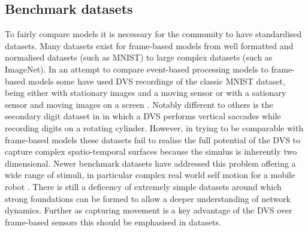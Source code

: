 \subsection{Benchmark datasets}
To fairly compare models it is necessary for the community to have standardised datasets\cite{barranco2016dataset, Gibson2014, tan2015benchmarking}.
Many datasets exist for frame-based models from well formatted and normalised datasets (such as MNIST\cite{lecun1998gradient}) to large complex datasets (such as ImageNet\cite{deng2009imagenet}).
In an attempt to compare event-based processing models to frame-based models some have used DVS recordings of the classic MNIST dataset, being either with stationary images and a moving sensor \cite{OConnor2013, orchard2015converting} or with a sationary sensor and moving images on a screen \cite{serrano2015poker, akolkar2015can}.
Notably different to others is the secondary digit dataset in \cite{akolkar2015can} in which a DVS performs vertical saccades while recording digits on a rotating cylinder.
However, in trying to be comparable with frame-based models these datasets fail to realise the full potential of the DVS to capture complex spatio-temporal surfaces because the simulus is inherently two dimensional.
Newer benchmark datasets have addressed this problem offering a wide range of stimuli, in particular complex real world self motion for a mobile robot \cite{Gibson2014, barranco2016dataset}.
There is still a deficency of extremely simple datasets around which strong foundations can be formed to allow a deeper understanding of network dynamics.
Further as capturing movement is a key advantage of the DVS over frame-based sensors this should be emphasised in datasets.




